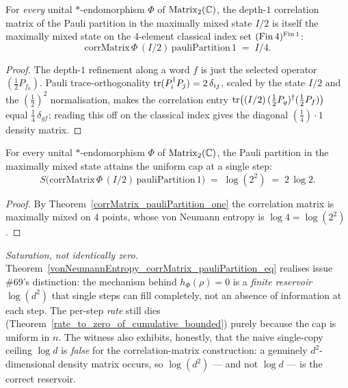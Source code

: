 \begin{theorem}\label{corrMatrix_pauliPartition_one}
  \leanok
  For \emph{every} unital \(*\)-endomorphism \(\Phi\) of \(\operatorname{Matrix}_2(\mathbb{C})\), the depth-\(1\)
  correlation matrix of the Pauli partition in the maximally mixed state \(I/2\) is itself the
  maximally mixed state on the \(4\)-element classical index set \((\operatorname{Fin} 4)^{\operatorname{Fin} 1}\):
  \[
    \mathrm{corrMatrix}\,\Phi\,(I/2)\,\mathrm{pauliPartition}\,1 \;=\; I/4 .
  \]
\end{theorem}
\begin{proof}\leanok
  The depth-\(1\) refinement along a word \(f\) is just the selected operator
  \((\tfrac12 P_{f_0})\). Pauli trace-orthogonality \(\operatorname{tr}(P_i^{\dagger}P_j) = 2\,\delta_{ij}\), scaled
  by the state \(I/2\) and the \((\tfrac12)^{2}\) normalisation, makes the correlation entry
  \(\operatorname{tr}\bigl((I/2)\,(\tfrac12 P_g)^{\dagger}(\tfrac12 P_f)\bigr)\) equal \(\tfrac14\,\delta_{gf}\);
  reading this off on the classical index gives the diagonal \((\tfrac14)\cdot 1\) density matrix.
\end{proof}

\begin{theorem}[The reservoir cap is tight at \(d = 2\)]\label{vonNeumannEntropy_corrMatrix_pauliPartition_eq}
  \leanok
  For every unital \(*\)-endomorphism \(\Phi\) of \(\operatorname{Matrix}_2(\mathbb{C})\), the Pauli partition in the
  maximally mixed state attains the uniform cap at a single step:
  \[
    S\bigl(\mathrm{corrMatrix}\,\Phi\,(I/2)\,\mathrm{pauliPartition}\,1\bigr)
      \;=\; \log(2^{2}) \;=\; 2\,\log 2 .
  \]
\end{theorem}
\begin{proof}\leanok
  By Theorem~\ref{corrMatrix_pauliPartition_one} the correlation matrix is maximally mixed on \(4\)
  points, whose von Neumann entropy is \(\log 4 = \log(2^{2})\).
\end{proof}

\emph{Saturation, not identically zero.} Theorem~\ref{vonNeumannEntropy_corrMatrix_pauliPartition_eq}
realises issue \#69's distinction: the mechanism behind \(h_\Phi(\rho) = 0\) is a \emph{finite
reservoir} \(\log(d^{2})\) that single steps can fill completely, not an absence of information at
each step. The per-step \emph{rate} still dies (Theorem~\ref{rate_to_zero_of_cumulative_bounded})
purely because the cap is uniform in \(n\). The witness also exhibits, honestly, that the naive
single-copy ceiling \(\log d\) is \emph{false} for the correlation-matrix construction: a genuinely
\(d^{2}\)-dimensional density matrix occurs, so \(\log(d^{2})\) --- and not \(\log d\) --- is the
correct reservoir.

